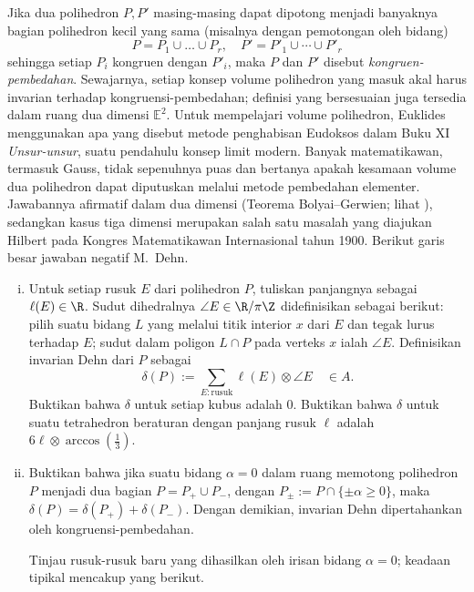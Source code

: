 \begin{Exercises}
	Jika dua polihedron $P, P'$ masing-masing dapat dipotong menjadi banyaknya bagian polihedron kecil yang sama (misalnya dengan pemotongan oleh bidang)
	\[ P = P_1 \cup \ldots \cup P_r, \quad P' = P'_1 \cup \cdots \cup P'_r \]
	sehingga setiap $P_i$ kongruen dengan $P'_i$, maka $P$ dan $P'$ disebut \emph{kongruen-pembedahan}. Sewajarnya, setiap konsep volume polihedron yang masuk akal harus invarian terhadap kongruensi-pembedahan; definisi yang bersesuaian juga tersedia dalam ruang dua dimensi $\mathbb{E}^2$. Untuk mempelajari volume polihedron, Euklides menggunakan apa yang disebut metode penghabisan Eudoksos dalam Buku XI \emph{Unsur-unsur}, suatu pendahulu konsep limit modern. Banyak matematikawan, termasuk Gauss, tidak sepenuhnya puas dan bertanya apakah kesamaan volume dua polihedron dapat diputuskan melalui metode pembedahan elementer. Jawabannya afirmatif dalam dua dimensi (Teorema Bolyai--Gerwien; lihat \cite[Theorem 24.7]{Har00}), sedangkan kasus tiga dimensi merupakan salah satu masalah yang diajukan Hilbert pada Kongres Matematikawan Internasional tahun 1900. Berikut garis besar jawaban negatif M.\ Dehn.
		\begin{enumerate}[(i)]
			\item Untuk setiap rusuk $E$ dari polihedron $P$, tuliskan panjangnya sebagai $\ell(E) \in \R$. Sudut dihedralnya $\angle E \in \R/\pi\Z$ didefinisikan sebagai berikut: pilih suatu bidang $L$ yang melalui titik interior $x$ dari $E$ dan tegak lurus terhadap $E$; sudut dalam poligon $L \cap P$ pada verteks $x$ ialah $\angle E$. Definisikan invarian Dehn dari $P$ sebagai
				\[ \delta(P) := \sum_{E: \text{rusuk}} \ell(E) \otimes \angle E \quad \in A. \]
				Buktikan bahwa $\delta$ untuk setiap kubus adalah $0$. Buktikan bahwa $\delta$ untuk suatu tetrahedron beraturan dengan panjang rusuk $\ell$ adalah $6\ell \otimes \arccos(\frac{1}{3})$.
			\item Buktikan bahwa jika suatu bidang $\alpha=0$ dalam ruang memotong polihedron $P$ menjadi dua bagian $P = P_+ \cup P_-$, dengan $P_{\pm} := P \cap \{\pm\alpha \geq 0 \}$, maka $\delta(P) = \delta(P_+) + \delta(P_-)$. Dengan demikian, invarian Dehn dipertahankan oleh kongruensi-pembedahan.
				\begin{hint}
					Tinjau rusuk-rusuk baru yang dihasilkan oleh irisan bidang $\alpha=0$; keadaan tipikal mencakup yang berikut.
					\begin{center}
\end{center}
\end{hint}
\end{enumerate}
\end{Exercises}
